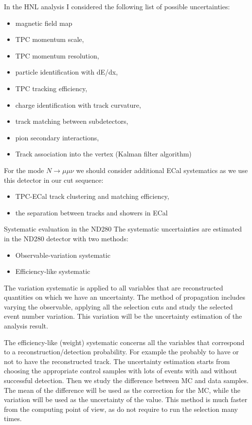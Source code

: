 \documentclass[../main.tex]{subfiles}
\begin{document}
In the HNL analysis I considered the following list of possible uncertainties:
\begin{itemize}
    \item magnetic field map
    \item TPC momentum scale,
    \item TPC momentum resolution,
    \item particle identification with dE/dx,
    \item TPC tracking efficiency,
    \item charge identification with track curvature,
    \item track matching between subdetectors,
    \item pion secondary interactions,
    \item Track association into the vertex (Kalman filter algorithm)
\end{itemize}

For the mode $N\to\mu\mu\nu$ we should consider additional ECal systematics as we use this detector in our cut sequence:

\begin{itemize}
    \item TPC-ECal track clustering and matching efficiency,
    \item the separation between tracks and showers in ECal
\end{itemize}

\begin{bclogo}[couleur=blue!2, arrondi=0.1, logo=\bcinfo, nobreak=true]{Systematic evaluation in the ND280}
    The systematic uncertainties are estimated in the ND280 detector with two methods:
    \begin{itemize}
        \item Observable-variation systematic
        \item Efficiency-like systematic
    \end{itemize}

    The variation systematic is applied to all variables that are reconstructed quantities on which we have an uncertainty. The method of propagation includes varying the observable, applying all the selection cuts and study the selected event number variation. This variation will be the uncertainty estimation of the analysis result.

    The efficiency-like (weight) systematic concerns all the variables that correspond to a reconstruction/detection probability. For example the probably to have or not to have the reconstructed track. The uncertainty estimation starts from choosing the appropriate control samples with lots of events with and without successful detection. Then we study the difference between MC and data samples. The mean of the difference will be used as the correction for the MC, while the variation will be used as the uncertainty of the value. This method is much faster from the computing point of view, as do not require to run the selection many times.
\end{bclogo}
\end{document}
